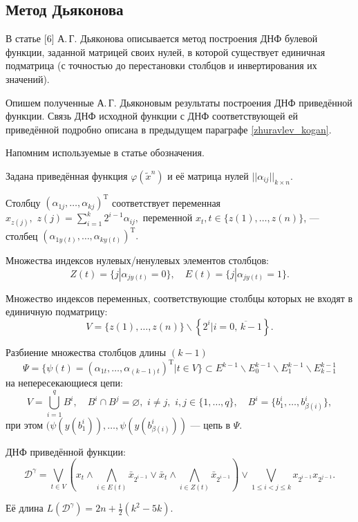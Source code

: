 \documentclass[12pt,a4paper,oneside,fleqn,leqno]{article}
\theoremstyle{definition}
\begin{document}
		\subsection{Метод Дьяконова} \label{dj}
			В статье [6] А.\,Г. Дьяконова описывается метод построения ДНФ булевой функции, заданной матрицей своих нулей, в которой существует единичная подматрица (с точностью до перестановки столбцов и инвертирования их значений).\par
			Опишем полученные А.\,Г. Дьяконовым результаты построения ДНФ приведённой функции. Связь ДНФ исходной функции с ДНФ соответствующей ей приведённой подробно описана в предыдущем параграфе \ref{zhuravlev_kogan}.\par
			Напомним используемые в статье обозначения.\par
			Задана приведённая функция $\varphi(\tilde x^n)$ и её матрица нулей $||\alpha_{ij}||_{k \times n}.$\par
			Столбцу $(\alpha_{1j}, \ldots, \alpha_{kj})^{\text{T}}$ соответствует переменная $x_{z(j)},\,\,z(j) = \sum\limits_{i = 1}^k 2^{i - 1}\alpha_{ij},$ переменной $x_t,t\in \{z(1),\ldots,z(n)\}$, --- столбец $(\alpha_{1y(t)}, \ldots, \alpha_{ky(t)})^{\text{T}}.$\par
			Множества индексов нулевых/ненулевых элементов столбцов:
			$$
				Z(t) = \{j | \alpha_{jy(t)} = 0\},\quad E(t) = \{j | \alpha_{jy(t)} = 1\}.
			$$\par
			Множество индексов переменных, соответствующие столбцы которых не входят в единичную подматрицу:
			$$
				V = \{z(1), \ldots, z(n)\} \backslash \left\{2^i | i = \overline{0,\,k - 1}\right\}.
			$$\par
			Разбиение множества столбцов длины $(k - 1)$
			$$
				\Psi = \{\psi(t) = (\alpha_{1t}, \ldots, \alpha_{(k - 1) t})^{\text{T}} | t \in V\} \subset E^{k - 1}\backslash E^{k - 1}_0\backslash E^{k - 1}_1 \backslash E^{k - 1}_{k - 1}
			$$
			 на непересекающиеся цепи:
			$$
				V = \bigcup_{i = 1}^qB^i,\quad B^i\cap B^j = \varnothing,\,\,i \neq j,\,\,i,j \in \{1,\ldots,q\},\quad B^i = \{b^i_1,\ldots, b^i_{\beta(i)} \},
			$$
			при этом $(\psi(y(b^i_1)), \ldots, \psi(y(b^i_{\beta(i)}))$ --- цепь в $\Psi.$\par
			ДНФ приведённой функции:
			$$
				\mathcal{D}^{\gamma} = \bigvee_{t  \in V} \left(x_t \wedge \bigwedge_{i \in E(t)} \bar{x}_{2^{i - 1}} \vee \bar{x}_t \wedge \bigwedge_{i \in Z(t)} \bar{x}_{2^{i - 1}}\right) \vee \bigvee_{1 \leqslant i < j \leqslant k} x_{2^{i - 1}} x_{2^{j - 1}}.
			$$\par
			Её длина $L(\mathcal{D}^{\gamma}) = 2n + \frac{1}{2}(k^2 - 5k).$\par
			
\end{document}
